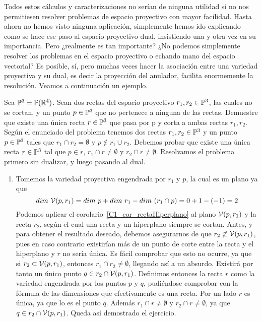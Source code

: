 Todos estos cálculos y caracterizaciones no serían de ninguna utilidad si no nos permitiesen resolver problemas de espacio proyectivo con mayor facilidad. Hasta ahora no hemos visto ninguna aplicación, simplemente hemos ido explicando como se hace ese paso al espacio proyectivo dual, insistiendo una y otra vez en su importancia. Pero ¿realmente es tan importante? ¿No podemos simplemente resolver los problemas en el espacio proyectivo o echando mano del espacio vectorial? Es posible, sí, pero muchas veces hacer la asociación entre una variedad proyectiva y su dual, es decir la proyección del anulador, facilita enormemente la resolución. Veamos a continuación un ejemplo.
\begin{exa}
	Sea $\mathbb{P}^3=\mathbb{P}(\mathbb{R}^4)$. Sean dos rectas del espacio proyectivo $r_1,r_2\in\mathbb{P}^3$, las cuales no se cortan, y un punto $p\in\mathbb{P}^3$ que no pertenece a ninguna de las rectas. Demuestre que existe una única recta $r\in\mathbb{P}^3$ que pasa por p y corta a ambas rectas $r_1, r_2$.\\
	
	Según el enunciado del problema tenemos dos rectas $r_1,r_2\in\mathbb{P}^3$ y un punto $p\in\mathbb{P}^3$ tales que $r_1\cap r_2=\emptyset$ y $p\not\in r_1\cup r_2$. Debemos probar que existe una única recta $r\in\mathbb{P}^3$ tal que $p\in r$, $r_1\cap r\not=\emptyset$ y $r_2\cap r\not=\emptyset$. Resolvamos el problema primero sin dualizar, y luego pasando al dual.
	\begin{enumerate}
		\item Tomemos la variedad proyectiva engendrada por $r_1$ y $p$, la cual es un plano ya que
		\begin{equation*}
			dim \ \engen{p,r_1}=dim \ p+dim \ r_1-dim \ (r_1\cap p)=0+1-(-1)=2
		\end{equation*}
		Podemos aplicar el corolario~\ref{C1_cor_rectaHiperplano} al plano $\mathcal{V}(p,r_1)$ y la recta $r_2$, según el cual una recta y un hiperplano siempre se cortan. Antes, y para obtener el resultado deseado, debemos asegurarnos de que $r_2\not\subset\mathcal{V}(p,r_1)$, pues en caso contrario existirían más de un punto de corte entre la recta y el hiperplano y $r$ no sería única. Es fácil comprobar que esto no ocurre, ya que si $r_2\subset\mathcal{V}(p,r_1)$, entonces $r_1\cap r_2\not=\emptyset$, llegando así a un absurdo. Existirá por tanto un único punto $q\in r_2\cap\mathcal{V}(p,r_1)$. Definimos entonces la recta $r$ como la variedad engendrada por los puntos $p$ y $q$, pudiéndose comprobar con la fórmula de las dimensiones que efectivamente es una recta. Por un lado $r$ es única, ya que lo es el punto $q$. Además $r_1\cap r\not=\emptyset$ y $r_2\cap r\not=\emptyset$, ya que $q\in r_2\cap\mathcal{V}(p,r_1)$. Queda así demostrado el ejercicio.
		

\end{enumerate}
\end{exa}
